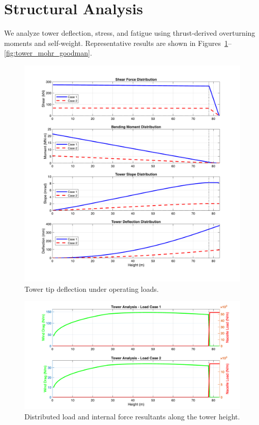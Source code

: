 \documentclass[11pt]{article}
\begin{document}
\section{Structural Analysis}
We analyze tower deflection, stress, and fatigue using thrust-derived overturning moments and self-weight. Representative results are shown in Figures~\ref{fig:tower_deflection}--\ref{fig:tower_mohr_goodman}.

\begin{figure}[h]
  \centering
  \includegraphics[width=0.9\linewidth]{../../Tower_Deflection_Analysis.png}
  \caption{Tower tip deflection under operating loads.}
  \label{fig:tower_deflection}
\end{figure}

\begin{figure}[h]
  \centering
  \includegraphics[width=0.9\linewidth]{../../Tower_Load_Distribution.png}
  \caption{Distributed load and internal force resultants along the tower height.}
  \label{fig:tower_loads}
\end{figure}
\end{document}
